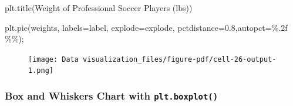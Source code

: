 \documentclass[
  letterpaper,
  DIV=11,
  numbers=noendperiod]{scrreprt}
\newenvironment{Shaded}{\begin{snugshade}}{\end{snugshade}}
\newcommand{\FloatTok}[1]{\textcolor[rgb]{0.68,0.00,0.00}{#1}}
\newcommand{\NormalTok}[1]{\textcolor[rgb]{0.00,0.23,0.31}{#1}}
\newcommand{\OperatorTok}[1]{\textcolor[rgb]{0.37,0.37,0.37}{#1}}
\newcommand{\SpecialCharTok}[1]{\textcolor[rgb]{0.37,0.37,0.37}{#1}}
\newcommand{\StringTok}[1]{\textcolor[rgb]{0.13,0.47,0.30}{#1}}
\begin{document}
\begin{Shaded}
\begin{Highlighting}[]
\NormalTok{plt.title(}\StringTok{\textquotesingle{}Weight of Professional Soccer Players (lbs)\textquotesingle{}}\NormalTok{)}

\NormalTok{plt.pie(weights, labels}\OperatorTok{=}\NormalTok{label, explode}\OperatorTok{=}\NormalTok{explode, pctdistance}\OperatorTok{=}\FloatTok{0.8}\NormalTok{,autopct}\OperatorTok{=}\StringTok{\textquotesingle{}}\SpecialCharTok{\%.2f}\StringTok{ }\SpecialCharTok{\%\%}\StringTok{\textquotesingle{}}\NormalTok{)}\OperatorTok{;}
\end{Highlighting}
\end{Shaded}

\begin{figure}[H]

{\centering \texttt{[image: Data visualization\_files/figure-pdf/cell-26-output-1.png]}

}

\end{figure}

\hypertarget{box-and-whiskers-chart-with-plt.boxplot}{%
\subsubsection{\texorpdfstring{Box and Whiskers Chart with
\texttt{plt.boxplot()}}{Box and Whiskers Chart with plt.boxplot()}}\label{box-and-whiskers-chart-with-plt.boxplot}}
\end{document}
